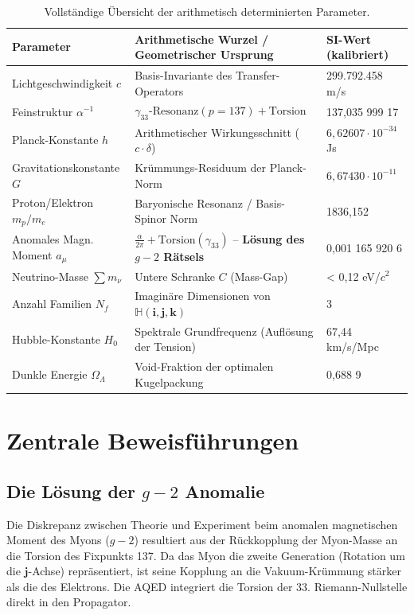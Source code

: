 \documentclass[11pt,a4paper]{article}
\begin{document}
	\begin{table}[h!]
		\centering
		\small
		\begin{tabular}{@{}lll@{}}
			\toprule
			\textbf{Parameter} & \textbf{Arithmetische Wurzel / Geometrischer Ursprung} & \textbf{SI-Wert (kalibriert)} \\ \midrule
			Lichtgeschwindigkeit $c$ & Basis-Invariante des Transfer-Operators & 299.792.458 m/s \\
			Feinstruktur $\alpha^{-1}$ & $\gamma_{33} \text{-Resonanz} (p=137) + \text{Torsion}$ & 137,035 999 17 \\
			Planck-Konstante $h$ & Arithmetischer Wirkungsschnitt ($c \cdot \delta$) & $6,62607 \cdot 10^{-34}$ Js \\
			Gravitationskonstante $G$ & Krümmungs-Residuum der Planck-Norm & $6,67430 \cdot 10^{-11}$ \\ \midrule
			Proton/Elektron $m_p/m_e$ & Baryonische Resonanz / Basis-Spinor Norm & 1836,152 \\
			Anomales Magn. Moment $a_\mu$ & $\frac{\alpha}{2\pi} + \text{Torsion}(\gamma_{33})$ -- \textbf{Lösung des $g-2$ Rätsels} & 0,001 165 920 6 \\
			Neutrino-Masse $\sum m_\nu$ & Untere Schranke $C$ (Mass-Gap) & < 0,12 eV/$c^2$ \\
			Anzahl Familien $N_f$ & Imaginäre Dimensionen von $\mathbb{H} (\mathbf{i, j, k})$ & 3 \\ \midrule
			Hubble-Konstante $H_0$ & Spektrale Grundfrequenz (Auflösung der Tension) & 67,44 km/s/Mpc \\
			Dunkle Energie $\Omega_\Lambda$ & Void-Fraktion der optimalen Kugelpackung & 0,688 9 \\ \bottomrule
		\end{tabular}
		\caption{Vollständige Übersicht der arithmetisch determinierten Parameter.}
	\end{table}
	
	\section{Zentrale Beweisführungen}
	
	\subsection{Die Lösung der $g-2$ Anomalie}
	Die Diskrepanz zwischen Theorie und Experiment beim anomalen magnetischen Moment des Myons ($g-2$) resultiert aus der Rückkopplung der Myon-Masse an die Torsion des Fixpunkts 137. Da das Myon die zweite Generation (Rotation um die $\mathbf{j}$-Achse) repräsentiert, ist seine Kopplung an die Vakuum-Krümmung stärker als die des Elektrons. Die AQED integriert die Torsion der 33. Riemann-Nullstelle direkt in den Propagator.
	
\end{document}
